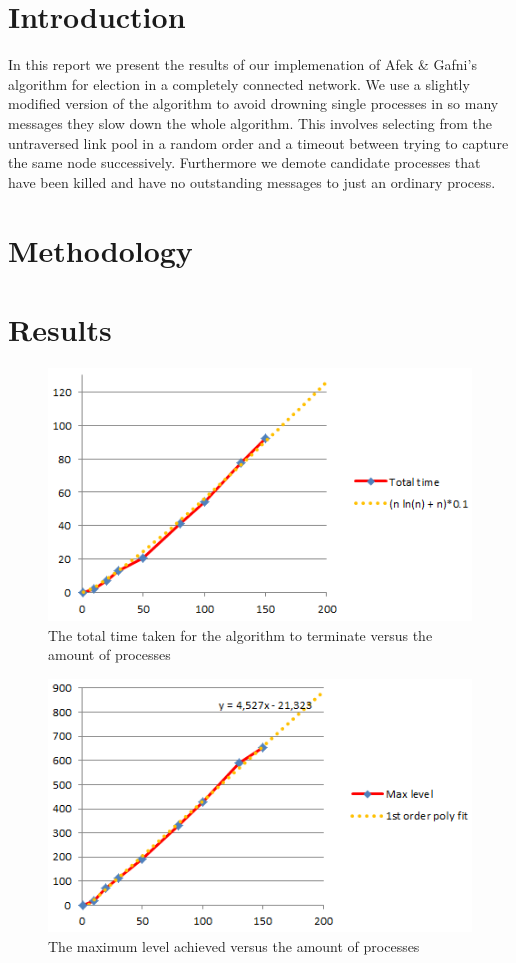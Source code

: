 \documentclass[12pt]{article}
\begin{document}
\setlength\headheight{0.8in}
\setlength\topmargin{-0.6in}
\setlength\textheight{9.0in}
\setlength\parindent{0pt}

\section{Introduction}
In this report we present the results of our implemenation of Afek \& Gafni's algorithm for election in a completely connected network.
We use a slightly modified version of the algorithm to avoid drowning single processes in so many messages they slow down the
whole algorithm. This involves selecting from the untraversed link pool in a random order and a timeout between trying to capture
the same node successively. Furthermore we demote candidate processes that have been killed and have no outstanding messages
to just an ordinary process.

\section{Methodology}

\section{Results}

\begin{figure}[h]
    \centering
    \includegraphics{totaltime.png}
    \caption{The total time taken for the algorithm to terminate versus the amount of processes}
    \label{fig:totaltime}
\end{figure}

\begin{figure}[h]
    \centering
    \includegraphics{maxlevel.png}
    \caption{The maximum level achieved versus the amount of processes}
    \label{fig:maxlevel}
\end{figure}
\end{document}

